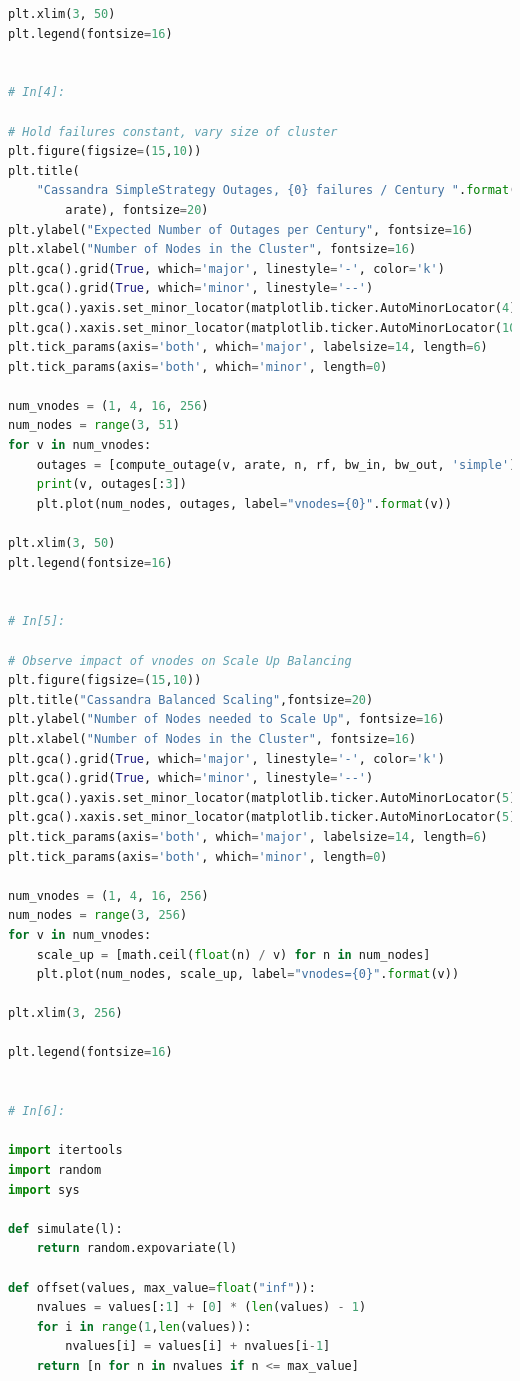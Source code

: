 \documentclass{article}
\begin{document}
\begin{lstlisting}[language=Python]
plt.xlim(3, 50)
plt.legend(fontsize=16)


# In[4]:

# Hold failures constant, vary size of cluster
plt.figure(figsize=(15,10))
plt.title(
    "Cassandra SimpleStrategy Outages, {0} failures / Century ".format(
        arate), fontsize=20)
plt.ylabel("Expected Number of Outages per Century", fontsize=16)
plt.xlabel("Number of Nodes in the Cluster", fontsize=16)
plt.gca().grid(True, which='major', linestyle='-', color='k')
plt.gca().grid(True, which='minor', linestyle='--')
plt.gca().yaxis.set_minor_locator(matplotlib.ticker.AutoMinorLocator(4))
plt.gca().xaxis.set_minor_locator(matplotlib.ticker.AutoMinorLocator(10))
plt.tick_params(axis='both', which='major', labelsize=14, length=6)
plt.tick_params(axis='both', which='minor', length=0)

num_vnodes = (1, 4, 16, 256)
num_nodes = range(3, 51)
for v in num_vnodes:
    outages = [compute_outage(v, arate, n, rf, bw_in, bw_out, 'simple') for n in num_nodes]
    print(v, outages[:3])
    plt.plot(num_nodes, outages, label="vnodes={0}".format(v))

plt.xlim(3, 50)
plt.legend(fontsize=16)


# In[5]:

# Observe impact of vnodes on Scale Up Balancing
plt.figure(figsize=(15,10))
plt.title("Cassandra Balanced Scaling",fontsize=20)
plt.ylabel("Number of Nodes needed to Scale Up", fontsize=16)
plt.xlabel("Number of Nodes in the Cluster", fontsize=16)
plt.gca().grid(True, which='major', linestyle='-', color='k')
plt.gca().grid(True, which='minor', linestyle='--')
plt.gca().yaxis.set_minor_locator(matplotlib.ticker.AutoMinorLocator(5))
plt.gca().xaxis.set_minor_locator(matplotlib.ticker.AutoMinorLocator(5))
plt.tick_params(axis='both', which='major', labelsize=14, length=6)
plt.tick_params(axis='both', which='minor', length=0)

num_vnodes = (1, 4, 16, 256)
num_nodes = range(3, 256)
for v in num_vnodes:
    scale_up = [math.ceil(float(n) / v) for n in num_nodes]
    plt.plot(num_nodes, scale_up, label="vnodes={0}".format(v))

plt.xlim(3, 256)

plt.legend(fontsize=16)


# In[6]:

import itertools
import random
import sys

def simulate(l):
    return random.expovariate(l)

def offset(values, max_value=float("inf")):
    nvalues = values[:1] + [0] * (len(values) - 1)
    for i in range(1,len(values)):
        nvalues[i] = values[i] + nvalues[i-1]
    return [n for n in nvalues if n <= max_value]


\end{lstlisting}
\end{document}
